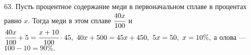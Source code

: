 63. Пусть процентное содержание меди в первоначальном сплаве в процентах равно $x.$ Тогда меди в этом сплаве $\cfrac{40x}{100}$ и $\cfrac{40x}{100}+5=\cfrac{x+10}{100}\cdot45,\ 40x+500=45x+450,\ 5x=50,\ x=10\%,$ а олова --- $100-10=90\%.$\\
